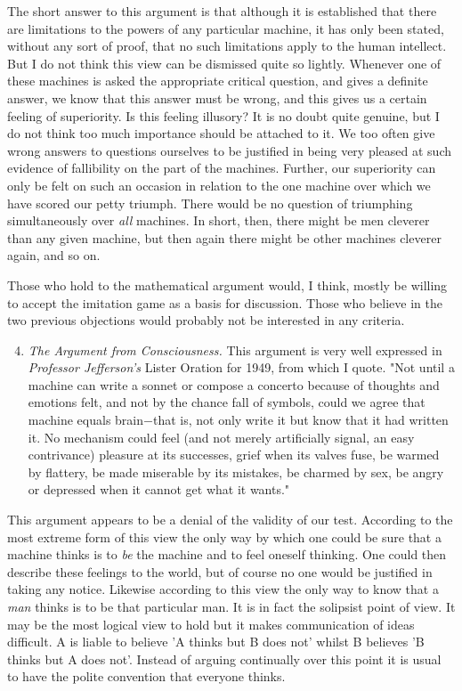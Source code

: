 \documentclass[12pt]{article}
\begin{document}
    The short answer to this argument is that although it is established that there are limitations to the powers of any particular machine, it has only been stated, without any sort of proof, that no such limitations apply to the human intellect. But I do not think this view can be dismissed quite so lightly. Whenever one of these machines is asked the appropriate critical question, and gives a definite answer, we know that this answer must be wrong, and this gives us a certain feeling of superiority. Is this feeling illusory? It is no doubt quite genuine, but I do not think too much importance should be attached to it. We too often give wrong answers to questions ourselves to be justified in being very pleased at such evidence of fallibility on the part of the machines. Further, our superiority can only be felt on such an occasion in relation to the one machine over which we have scored our petty triumph. There would be no question of triumphing simultaneously over \textit{all} machines. In short, then, there might be men cleverer than any given machine, but then again there might be other machines cleverer again, and so on.

    Those who hold to the mathematical argument would, I think, mostly be willing to accept the imitation game as a basis for discussion. Those who believe in the two previous objections would probably not be interested in any criteria.
    
    \begin{enumerate}[label=(\arabic*)]
        \setcounter{enumi}{3}
        \item{\textit{The Argument from Consciousness.} This argument is very well expressed in \textit{Professor Jefferson's} Lister Oration for 1949, from which I quote. "Not until a machine can write a sonnet or compose a concerto because of thoughts and emotions felt, and not by the chance fall of symbols, could we agree that machine equals brain$-$that is, not only write it but know that it had written it. No mechanism could feel (and not merely artificially signal, an easy contrivance) pleasure at its successes, grief when its valves fuse, be warmed by flattery, be made miserable by its mistakes, be charmed by sex, be angry or depressed when it cannot get what it wants."}
    \end{enumerate}

    This argument appears to be a denial of the validity of our test. According to the most extreme form of this view the only way by which one could be sure that a machine thinks is to \textit{be} the machine and to feel oneself thinking. One could then describe these feelings to the world, but of course no one would be justified in taking any notice. Likewise according to this view the only way to know that a \textit{man} thinks is to be that particular man. It is in fact the solipsist point of view. It may be the most logical view to hold but it makes communication of ideas difficult. A is liable to believe 'A thinks but B does not' whilst B believes 'B thinks but A does not'. Instead of arguing continually over this point it is usual to have the polite convention that everyone thinks.
\end{document}
